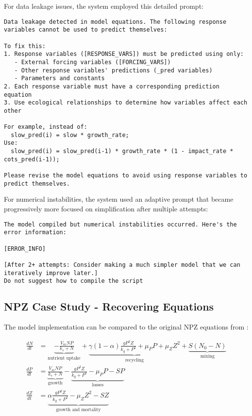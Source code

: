 For data leakage issues, the system employed this detailed prompt:

\begin{lstlisting}
Data leakage detected in model equations. The following response variables cannot be used to predict themselves:

To fix this:
1. Response variables ([RESPONSE_VARS]) must be predicted using only:
   - External forcing variables ([FORCING_VARS])
   - Other response variables' predictions (_pred variables)
   - Parameters and constants
2. Each response variable must have a corresponding prediction equation
3. Use ecological relationships to determine how variables affect each other

For example, instead of:
  slow_pred(i) = slow * growth_rate;
Use:
  slow_pred(i) = slow_pred(i-1) * growth_rate * (1 - impact_rate * cots_pred(i-1));

Please revise the model equations to avoid using response variables to predict themselves.
\end{lstlisting}

For numerical instabilities, the system used an adaptive prompt that became progressively more focused on simplification after multiple attempts:

\begin{lstlisting}
The model compiled but numerical instabilities occurred. Here's the error information:

[ERROR_INFO]

[After 2+ attempts: Consider making a much simpler model that we can iteratively improve later.]
Do not suggest how to compile the script
\end{lstlisting}

\subsection{NPZ Case Study - Recovering Equations}
\label{subsec:npz_evaluation_prompt}

The model implementation can be compared to the original NPZ equations from \cite{edwards1999zooplankton}:

\begin{align*}
\frac{dN}{dt} &= \underbrace{-\frac{V_m N P}{k_s + N}}_{\text{nutrient uptake}} + \underbrace{\gamma(1-\alpha)\frac{g P^2 Z}{k_g + P^2} + \mu_P P + \mu_Z Z^2}_{\text{recycling}} + \underbrace{S(N_0 - N)}_{\text{mixing}} \\
\frac{dP}{dt} &= \underbrace{\frac{V_m N P}{k_s + N}}_{\text{growth}} - \underbrace{\frac{g P^2 Z}{k_g + P^2} - \mu_P P - S P}_{\text{losses}} \\
\frac{dZ}{dt} &= \underbrace{\alpha\frac{g P^2 Z}{k_g + P^2} - \mu_Z Z^2 - S Z}_{\text{growth and mortality}}
\end{align*}


